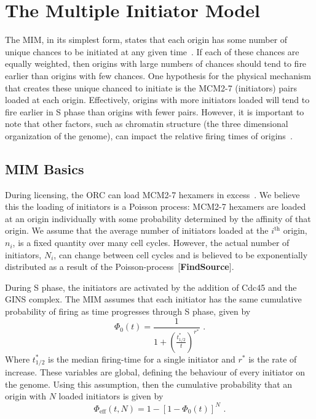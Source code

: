 {	\section{The Multiple Initiator Model}
	\label{sec:MIM}
	
	The MIM, in its simplest form, states that each origin has some number of unique chances to be initiated at any given time~\cite{ScottsThesis}.
	If each of these chances are equally weighted, then origins with large numbers of chances should tend to fire earlier than origins with few chances.
	One hypothesis for the physical mechanism that creates these unique chanced to initiate is the MCM2-7 (initiators) pairs loaded at each origin.
	Effectively, origins with more initiators loaded will tend to fire earlier in S phase than origins with fewer pairs.
	However, it is important to note that other factors, such as chromatin structure (the three dimensional organization of the genome), can impact the relative firing times of origins~\cite{Chromatin}.
	
		\subsection{MIM Basics}
		\label{subsec:MIMBasics}
		During licensing, the ORC can load MCM2-7 hexamers in excess~\cite{MultiMCM}.
		We believe this the loading of initiators is a Poisson process:
		MCM2-7 hexamers are loaded at an origin individually with some probability determined by the affinity of that origin.
		We assume that the average number of initiators loaded at the $i^{\text{th}}$ origin, $n_i$, is a fixed quantity over many cell cycles.
		However, the actual number of initiators, $N_i$, can change between cell cycles and is believed to be exponentially distributed as a result of the Poisson-process~[\textbf{FindSource}].
		
		During S phase, the initiators are activated by the addition of Cdc45 and the GINS complex.
		The MIM assumes that each initiator has the same cumulative probability of firing as time progresses through S phase, given by
		\begin{equation}\label{eq:CPDInitiator}
			\Phi_0(t) = \frac{1}{1+\left(\frac{t^*_{1/2}}{t}\right)^{r^*}}\text{ .}
		\end{equation}
		Where $t^*_{1/2}$ is the median firing-time for a single initiator and $r^*$ is the rate of increase.
		These variables are global, defining the behaviour of every initiator on the genome.
		Using this assumption, then the cumulative probability that an origin with $N$ loaded initiators is given by
		\begin{equation} \label{eq:CPDEffectiveN}
			\Phi_{\text{eff}}(t,N) = 1 - \left[1 - \Phi_0(t)\right]^N\text{ .}
		\end{equation}
		
}
